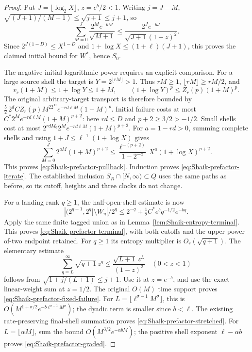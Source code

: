 \begin{proof}
Put \(J=\lfloor\log_2X\rfloor\), \(z=e^b/2<1\). Writing \(j=J-M\),
\(\sqrt{(J+1)/(M+1)}\le\sqrt{j+1}\le j+1\), so
\[
 \sum_{M=0}^J\frac{2^Me^{-bM}}{\sqrt{M+1}}
 \le \frac{2^Je^{-bJ}}{\sqrt{J+1}(1-z)^2}.
\]
Since \(2^{J(1-D)}\le X^{1-D}\) and
\(1+\log X\le(1+\ell)(J+1)\), this proves the claimed initial bound
for \(W^*\), hence \(S_0\).

The negative initial logarithmic power requires an explicit comparison.
For a large source shell the target is \(Y=2^{\lfloor rM\rfloor}>1\).
Thus \(rM\ge1\), \(\lfloor rM\rfloor\ge rM/2\), and
\[
 v_r(1+M)\le1+\log Y\le1+M,\qquad
 (1+\log Y)^p\le Z_r(p)(1+M)^p.
\]
The original arbitrary-target transport is therefore bounded by
\(\frac52\,2^d CZ_r(p)M^22^Me^{-rd\ell M}(1+M)^p\).
Initial failure costs at most \(C^*2^Me^{-rd\ell M}(1+M)^{p+2}\):
here \(rd\le D\) and \(p+2\ge3/2>-1/2\).
Small shells cost at most
\(2^{rdM_0}2^Me^{-rd\ell M}(1+M)^{p+2}\).
For \(a=1-rd>0\), summing complete shells and using
\(1+J\le\ell^{-1}(1+\log X)\) gives
\[
 \sum_{M=0}^J 2^{aM}(1+M)^{p+2}
 \le\frac{\ell^{-(p+2)}}{1-2^{-a}}\,
             X^a(1+\log X)^{p+2}.
\]
This proves \eqref{eq:Shaik-prefactor-pullback}. Induction proves
\eqref{eq:Shaik-prefactor-iterate}. The established inclusion
\(S_R\cap[N,\infty)\subset Q\) uses the same paths as before,
so its cutoff, heights and three clocks do not change.

For a landing rank \(q\ge1\), the half-open-shell estimate is now
\[
 |(2^{q-1},2^q]\setminus W_\eta|/2^q
 \le2^{-q}+\tfrac12 C^*e^b q^{-1/2}e^{-bq}.
\]
Apply the same finite tagged union as in
Lemma~\ref{lem:Shaik-entropy-terminal}. This proves
\eqref{eq:Shaik-prefactor-terminal}, with both cutoffs and the
upper power-of-two endpoint retained.
For \(q\ge1\) its entropy multiplier is \(O_r(\sqrt{q+1})\).
The elementary estimate
\[
 \sum_{q=L}^\infty\sqrt{q+1}\,z^q
 \le\frac{\sqrt{L+1}\,z^L}{(1-z)^2}\quad(0<z<1)
\]
follows from \(\sqrt{1+j/(L+1)}\le j+1\).
Use it at \(z=e^{-b}\), and use the exact linear-weight sum at
\(z=1/2\). The original \(O(M)\) time support proves
\eqref{eq:Shaik-prefactor-fixed-failure}.
For \(L=\lfloor\ell^{\sigma-1}M^\sigma\rfloor\), this is
\(O(M^{1+\sigma/2}e^{-b\ell^{\sigma-1}M^\sigma})\);
the dyadic term is smaller since \(b<\ell\).
The existing rate-preserving final-shell summation proves
\eqref{eq:Shaik-prefactor-stretched}. For \(L=\lfloor\alpha M\rfloor\),
sum the bound \(O(M^{3/2}e^{-\alpha bM})\);
the positive shell exponent \(\ell-\alpha b\) proves
\eqref{eq:Shaik-prefactor-graded}.
\end{proof}

